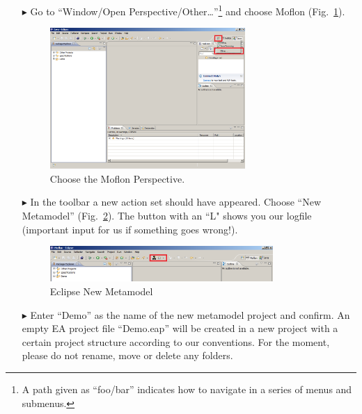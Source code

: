 \begin{enumerate}
\item[$\blacktriangleright$] Go to ``Window/Open
Perspective/Other\ldots''\footnote{A path given as ``foo/bar'' indicates how to
navigate in a series of menus and submenus.} and choose Moflon
(Fig.~\ref{fig_eclipse}). \begin{figure}[!h]
	\centering
  \includegraphics[width=0.7\textwidth]{pics/eclipse_firststart.png}
	\caption{Choose the Moflon Perspective.}
	\label{fig_eclipse}
\end{figure}

\item[$\blacktriangleright$] In the toolbar a new action set should have
appeared. Choose ``New Metamodel'' (Fig.~\ref{fig_eclipseNewMetamodel}).
The button with an ``L" shows you our logfile (important input for us if
something goes wrong!).
\begin{figure}[!h]
	\centering
  \includegraphics[width=0.8\textwidth]{pics/eclipse_metamodelButton.png}
	\caption{Eclipse New Metamodel}
	\label{fig_eclipseNewMetamodel}
\end{figure}

\item[$\blacktriangleright$] Enter ``Demo'' as the name of the new metamodel
project and confirm. 
An empty EA project file ``Demo.eap'' will be
created in a new project with a certain project structure
according to our conventions.  For the moment, please do not rename, move or
delete any folders.

\newpage


\end{enumerate}
